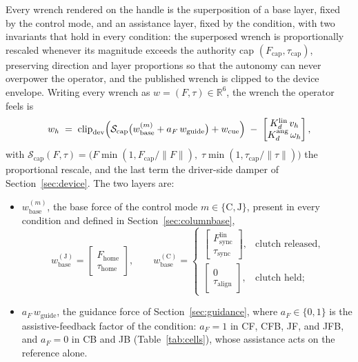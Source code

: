 Every wrench rendered on the handle is the superposition of a base layer, fixed by the control mode, and an assistance layer, fixed by the condition, with two invariants that hold in every condition: the superposed wrench is proportionally rescaled whenever its magnitude exceeds the authority cap $(F_{\text{cap}}, \tau_{\text{cap}})$, preserving direction and layer proportions so that the autonomy can never overpower the operator, and the published wrench is clipped to the device envelope. Writing every wrench as $w = (F, \tau) \in \mathbb{R}^6$, the wrench the operator feels is
\begin{equation}
w_h \;=\; \operatorname{clip}_{\text{dev}}\Bigl(\mathcal{S}_{\text{cap}}\bigl(w_{\text{base}}^{(m)} + a_F\,w_{\text{guide}}\bigr) + w_{\text{cue}}\Bigr) \;-\; \begin{bmatrix} K_d^{\text{lin}}\,v_h \\ K_d^{\text{ang}}\,\omega_h \end{bmatrix},
\label{eq:wtotal}
\end{equation}
with $\mathcal{S}_{\text{cap}}(F, \tau) = \bigl(F\min(1, F_{\text{cap}}/\|F\|),\; \tau\min(1, \tau_{\text{cap}}/\|\tau\|)\bigr)$ the proportional rescale, and the last term the driver-side damper of Section~\ref{sec:device}. The two layers are:
\begin{itemize}[nosep]
\item $w_{\text{base}}^{(m)}$, the base force of the control mode $m \in \{\text{C}, \text{J}\}$, present in every condition and defined in Section~\ref{sec:columnbase},
\begin{equation}
w_{\text{base}}^{(\text{J})} = \begin{bmatrix} F_{\text{home}} \\ \tau_{\text{home}} \end{bmatrix},
\qquad
w_{\text{base}}^{(\text{C})} =
\begin{cases}
\begin{bmatrix} F_{\text{sync}}^{\text{lin}} \\ \tau_{\text{sync}} \end{bmatrix}, & \text{clutch released},\\[10pt]
\begin{bmatrix} 0 \\ \tau_{\text{align}} \end{bmatrix}, & \text{clutch held};
\end{cases}
\label{eq:wbase}
\end{equation}
\item $a_F\,w_{\text{guide}}$, the guidance force of Section~\ref{sec:guidance}, where $a_F \in \{0, 1\}$ is the assistive-feedback factor of the condition: $a_F = 1$ in CF, CFB, JF, and JFB, and $a_F = 0$ in CB and JB (Table~\ref{tab:cells}), whose assistance acts on the reference alone.
\end{itemize}
